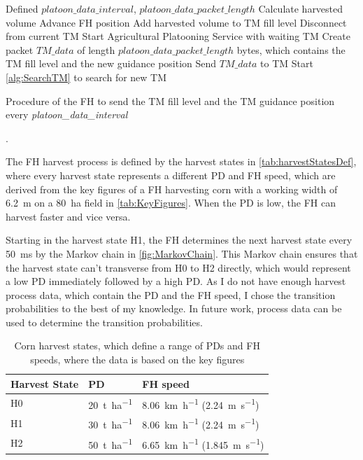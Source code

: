 \begin{algorithm}
\begin{algorithmic}[1]
\REQUIRE Defined $platoon\_data\_interval$, $platoon\_data\_packet\_length$
\STATE Calculate harvested volume
\STATE Advance \ac{FH} position
\STATE Add harvested volume to \ac{TM} fill level
    \STATE Disconnect from current \ac{TM}
	\STATE Start Agricultural Platooning Service with waiting \ac{TM}
\ELSE
	\STATE Create packet $TM\_data$ of length $platoon\_data\_packet\_length$ bytes, which contains the \ac{TM} fill level and the new guidance position
	\STATE Send $TM\_data$ to \ac{TM}
		\STATE Start \autoref{alg:SearchTM} to search for new \ac{TM}
	\ENDIF
\ENDIF
\end{algorithmic}
\caption{Procedure of the \acf{FH} to send the \acf{TM} fill level and the \ac{TM} guidance position every
\textit{platoon\_data\_interval}}.
\label{alg:UpdateTM}
\end{algorithm}

The FH harvest process is defined by the harvest states in \autoref{tab:harvestStatesDef},
where every harvest state represents a different \ac{PD} and \ac{FH} speed, which are derived from the key figures of a
\ac{FH} harvesting corn with a working width of \SI{6.2}{\meter} on a \SI{80}{\hectare} field in \autoref{tab:KeyFigures}.
When the \ac{PD} is low, the \ac{FH} can harvest faster and vice versa.

Starting in the harvest state H1, the \ac{FH} determines the next harvest state every \SI{50}{\milli\second}
by the Markov chain in \autoref{fig:MarkovChain}.
This Markov chain ensures that the harvest state can't transverse from H0 to H2 directly, which would represent
a low \ac{PD} immediately followed by a high \ac{PD}.
As I do not have enough harvest process data, which contain the \ac{PD} and the \ac{FH} speed,
I chose the transition probabilities to the best of my knowledge.
In future work, process data can be used to determine
the transition probabilities.

\begin{table}[H]
	\centering
	\begin{tabular}{>{\centering}p{2cm}p{4cm}p{4cm}}
		\toprule
		Harvest State & \ac{PD} & \ac{FH} speed\\
		\midrule
		H0 & \SI{20}{\tonne\per\hectare}
        & \SI{8.06}{\kilo\metre\per\hour} (\SI{2.24}{\metre\per\second}) \\
		H1 & \SI{30}{\tonne\per\hectare}
        & \SI{8.06}{\kilo\metre\per\hour} (\SI{2.24}{\metre\per\second}) \\
		H2 & \SI{50}{\tonne\per\hectare}
        & \SI{6.65}{\kilo\metre\per\hour} (\SI{1.845}{\metre\per\second}) \\
		\bottomrule
	\end{tabular}
	\caption{Corn harvest states, which define a range of \acf{PD}s and \acf{FH} speeds, where the data is based on the
	key figures \cite{faustzahlen2018}}
	\label{tab:harvestStatesDef}
\end{table}

